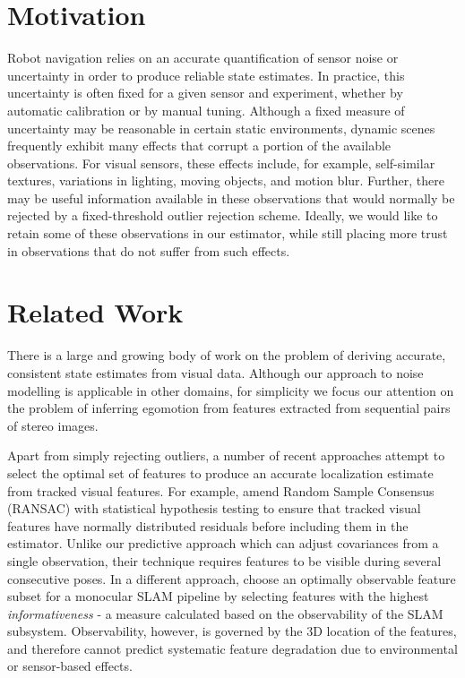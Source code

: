 \section{Motivation}

Robot navigation relies on an accurate quantification of sensor noise or uncertainty in order to produce reliable state estimates.
In practice, this uncertainty is often fixed for a given sensor and experiment, whether by automatic calibration or by manual tuning.
Although a fixed measure of uncertainty may be reasonable in certain static environments, dynamic scenes frequently exhibit many effects that corrupt a portion of the available observations.
For visual sensors, these effects include, for example, self-similar textures, variations in lighting, moving objects, and motion blur. 
Further, there may be useful information available in these observations that would normally be rejected by a fixed-threshold outlier rejection scheme. 
Ideally, we would like to retain some of these observations in our estimator, while still placing more trust in observations that do not suffer from such effects.


\section{Related Work}


There is a large and growing body of work on the problem of deriving accurate,
consistent state estimates from visual data.  Although our approach to noise
modelling is applicable in other domains, for simplicity we focus our attention
on the problem of inferring egomotion from features extracted from sequential
pairs of stereo images. 

Apart from simply rejecting outliers, a number of recent approaches attempt to
select the optimal set of features to produce an accurate localization estimate
from tracked visual features. For example, \citet{Tsotsos2015} amend Random
Sample Consensus (RANSAC) with statistical hypothesis testing to ensure that tracked visual features have normally distributed residuals before including them in
the estimator. Unlike our predictive approach which can adjust covariances from a single observation, their technique requires features to be visible during several consecutive poses. In a different
approach,  choose an optimally observable feature subset for a
monocular SLAM pipeline by selecting features with the highest \textit{informativeness} - a measure calculated based on the observability of the SLAM subsystem. Observability, however, is governed by the 3D location of the features, and therefore cannot predict systematic feature degradation due to environmental or sensor-based effects. 


